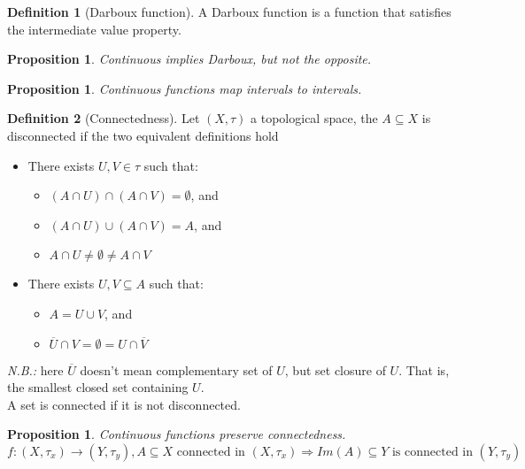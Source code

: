 \documentclass{article}
\newcommand{\Ar}{\Rightarrow}
\newcommand{\f}[3]{#1 : #2 \rightarrow #3}
\theoremstyle{definition}
\newtheorem{definition}{Definition}[section]
\theoremstyle{definition}
\theoremstyle{plain}
\theoremstyle{plain}
\theoremstyle{plain}
\theoremstyle{plain}
\newtheorem{proposition}[theorem]{Proposition}
\theoremstyle{definition}
\theoremstyle{remark}
\theoremstyle{remark}
\theoremstyle{remark}
\theoremstyle{remark}
\begin{document}
\begin{definition}[Darboux function]
  A Darboux function is a function that satisfies the intermediate value property.
\end{definition}


\begin{proposition}
  Continuous implies Darboux, but not the opposite.
\end{proposition}



\begin{proposition}
  Continuous functions map intervals to intervals.
\end{proposition}


\begin{definition}[Connectedness]
  Let $(X, \tau)$ a topological space, the $A \subseteq X$ is disconnected if the two equivalent definitions hold
  \begin{itemize}
    \item There exists $U, V \in \tau$ such that:
    \begin{itemize}
      \item $(A \cap U) \cap (A \cap V) = \emptyset$, and
      \item $(A \cap U) \cup (A \cap V) = A$, and
      \item $A \cap U \neq \emptyset \neq A \cap V$
    \end{itemize}
    \item There exists $U, V \subseteq A$ such that:
    \begin{itemize}
      \item $A = U \cup V$, and
      \item $\overline{U} \cap V = \emptyset = U \cap \overline{V}$
    \end{itemize}
  \end{itemize}
  \textit{N.B.:} here $\overline{U}$ doesn't mean complementary set of $U$, but set closure of $U$. That is, the smallest closed set containing $U$.\\
  A set is connected if it is not disconnected.
\end{definition}


\begin{proposition}
  Continuous functions preserve connectedness.\\
  \[
  \f{f}{(X,\tau_x)}{(Y,\tau_y)}, A \subseteq X \text{ connected in } (X,\tau_x) \Ar Im(A) \subseteq Y \text{ is connected in } (Y,\tau_y)
  \]
\end{proposition}
\end{document}
